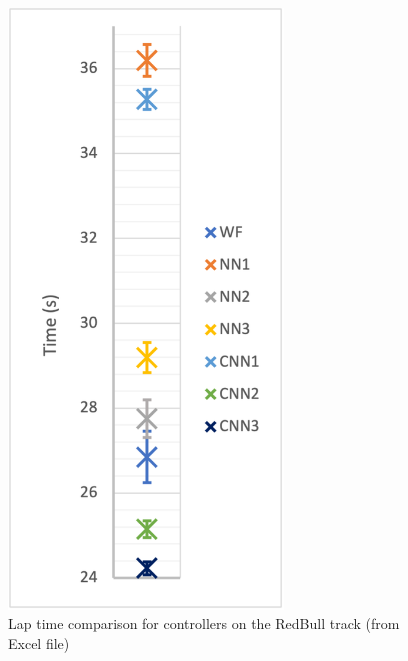 \begin{figure}
    \centering
    \begin{minipage}{0.45\textwidth}
        \centering
        \includegraphics[width=0.65\textwidth]{Figures/H1_Time.png}
        \caption{Lap time comparison for controllers on the RedBull track (from Excel file)}
        \label{h1_time}
    \end{minipage}\hfill
    \begin{minipage}{0.45\textwidth}
        \centering

\end{minipage}
\end{figure}

